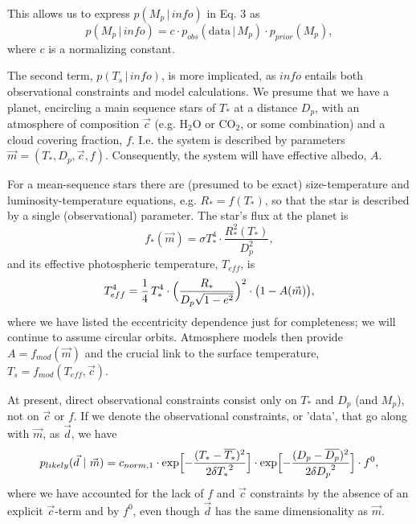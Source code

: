 \documentclass[12pt,preprint]{aastex}
\newcommand{\Gauss}[3]{\exp\Bigl [-\frac{({#1}-{#2})^2}{2{#3}^2}\Bigr ]}
\begin{document}
This allows us to express $p(M_p\, |\,  info)$ in Eq. 3 as 
\begin{equation}
p(M_p\, |\,  info) = c\cdot p_{obs}(\mathrm{data}\, | \, M_p)\cdot p_{prior}(M_p),
\end{equation}
where $c$ is a normalizing constant.

The second term, $p(T_s\, |\,  info)$, is more implicated, as $info$ entails both 
observational constraints and model calculations. We presume that we have a planet, 
encircling a main sequence stars of $T_*$ at a distance $D_p$, with an  
atmosphere of composition $\vec{c}$ (e.g. H$_2$O or CO$_2$, or some combination)
and a cloud covering fraction, $f$.
I.e. the system is described by parameters $\vec{m}=(T_*,D_p,\vec{c},f)$.
Consequently, the system will have effective albedo, $A$.

For a mean-sequence stars there are (presumed to be exact) size-temperature and luminosity-temperature
equations, e.g. $R_*=f(T_*)$, so that the star is described by a single (observational) parameter.
The star's flux at the planet is
\begin{equation}
f_* (\vec{m}) = \sigma T_*^4\cdot \frac{R_*^2(T_*)}{D_p^2},
\end{equation}
and its effective photospheric temperature, $T_{eff}$, is
\begin{equation}
T^4_{eff}=\frac{1}{4}\, T_*^4 \cdot \Bigl ( \frac{R_*}{D_p\sqrt{1-e^2}}\Bigr )^2\cdot \bigl (   1 - A(\vec{m})\bigr ),
\end{equation}
where we have listed the eccentricity dependence just for completeness; we will continue to assume 
circular orbits.
Atmosphere models then provide $A = f_{mod}(\vec{m})$ and the crucial link to the surface 
temperature, $T_s = f_{mod}(T_{eff},\vec{c})$.

At present, direct observational constraints consist only on $T_*$ and $D_p$ (and $M_p$), not on $\vec{c}$
or $f$. If we denote the observational constraints, or 'data', that go along with $\vec{m}$, as $\vec{d}$,
we have
\begin{equation}
p_{likely}(\vec{d}\ |\ \vec{m}) = c_{norm,1} \cdot \Gauss{T_*}{\overline{T_*}}{\delta T_*} 
\cdot \Gauss{D_p}{\overline{D_p}}{\delta D_p} \cdot f^0,
\end{equation}
where we have accounted for the lack of $f$ and $\vec{c}$ constraints by the absence of an
explicit $\vec{c}$-term and by $f^0$, even though $\vec{d}$ has the same dimensionality as $\vec{m}$.
\end{document}
